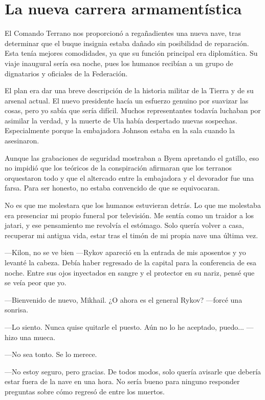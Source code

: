 \chapter{La nueva carrera armamentística}\label{sec:la-new-carrera-armamentistica}

El Comando Terrano nos proporcionó a regañadientes una nueva nave, tras determinar que el buque insignia estaba dañado sin posibilidad de reparación. Esta tenía mejores comodidades, ya que su función principal era diplomática. Su viaje inaugural sería esa noche, pues los humanos recibían a un grupo de dignatarios y oficiales de la Federación.

El plan era dar una breve descripción de la historia militar de la Tierra y de su arsenal actual. El nuevo presidente hacía un esfuerzo genuino por suavizar las cosas, pero yo sabía que sería difícil. Muchos representantes todavía luchaban por asimilar la verdad, y la muerte de Ula había despertado nuevas sospechas. Especialmente porque la embajadora Johnson estaba en la sala cuando la asesinaron.

Aunque las grabaciones de seguridad mostraban a Byem apretando el gatillo, eso no impidió que los teóricos de la conspiración afirmaran que los terranos orquestaron todo y que el altercado entre la embajadora y el devorador fue una farsa. Para ser honesto, no estaba convencido de que se equivocaran.

No es que me molestara que los humanos estuvieran detrás. Lo que me molestaba era presenciar mi propio funeral por televisión. Me sentía como un traidor a los jatari, y ese pensamiento me revolvía el estómago. Solo quería volver a casa, recuperar mi antigua vida, estar tras el timón de mi propia nave una última vez.

—Kilon, no se ve bien —Rykov apareció en la entrada de mis aposentos y yo levanté la cabeza. Debía haber regresado de la capital para la conferencia de esa noche. Entre sus ojos inyectados en sangre y el protector en su nariz, pensé que se veía peor que yo.

—Bienvenido de nuevo, Mikhail. ¿O ahora es el general Rykov? —forcé una sonrisa.

—Lo siento. Nunca quise quitarle el puesto. Aún no lo he aceptado, puedo... —hizo una mueca.

—No sea tonto. Se lo merece.

—No estoy seguro, pero gracias. De todos modos, solo quería avisarle que debería estar fuera de la nave en una hora. No sería bueno para ninguno responder preguntas sobre cómo regresó de entre los muertos.

